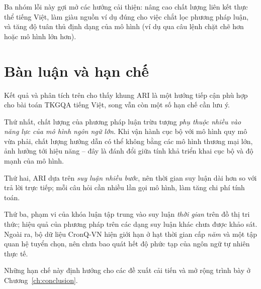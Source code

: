 Ba nhóm lỗi này gợi mở các hướng cải thiện: nâng cao chất lượng liên kết thực thể tiếng Việt, làm
giàu nguồn ví dụ đúng cho việc chắt lọc phương pháp luận, và tăng độ tuân thủ định dạng của mô hình
(ví dụ qua câu lệnh chặt chẽ hơn hoặc mô hình lớn hơn).

\section{Bàn luận và hạn chế}
\label{sec:discussion}

Kết quả và phân tích trên cho thấy khung ARI là một hướng tiếp cận phù hợp cho bài toán TKGQA tiếng
Việt, song vẫn còn một số hạn chế cần lưu ý.

Thứ nhất, chất lượng của phương pháp luận trừu tượng \emph{phụ thuộc nhiều vào năng lực của mô hình
ngôn ngữ lớn}. Khi vận hành cục bộ với mô hình quy mô vừa phải, chất lượng hướng dẫn có thể không
bằng các mô hình thương mại lớn, ảnh hưởng tới hiệu năng -- đây là đánh đổi giữa tính khả triển khai
cục bộ và độ mạnh của mô hình.

Thứ hai, ARI dựa trên \emph{suy luận nhiều bước}, nên thời gian suy luận dài hơn so với trả lời trực
tiếp; mỗi câu hỏi cần nhiều lần gọi mô hình, làm tăng chi phí tính toán.

Thứ ba, phạm vi của khóa luận tập trung vào suy luận \emph{thời gian} trên đồ thị tri thức; hiệu quả
của phương pháp trên các dạng suy luận khác chưa được khảo sát. Ngoài ra, bộ dữ liệu CronQ-VN hiện
giới hạn ở hạt thời gian cấp \emph{năm} và một tập quan hệ tuyển chọn, nên chưa bao quát hết độ phức
tạp của ngôn ngữ tự nhiên thực tế.

Những hạn chế này định hướng cho các đề xuất cải tiến và mở rộng trình bày ở Chương~\ref{ch:conclusion}.

